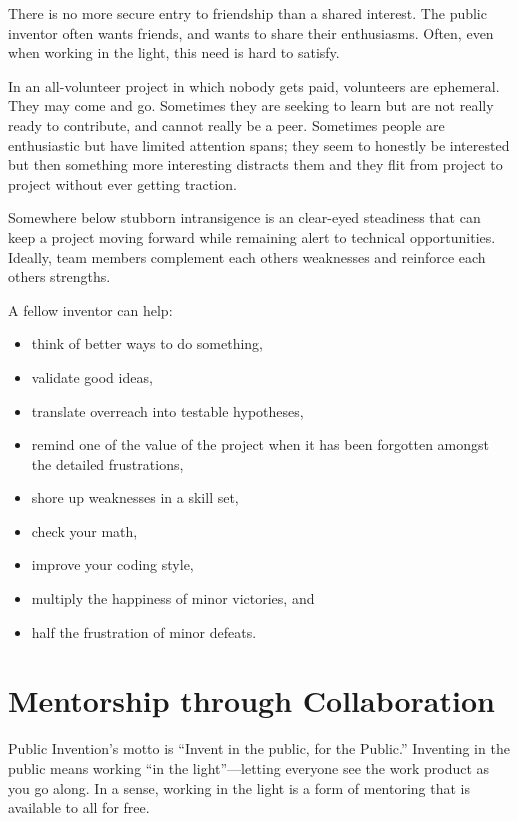 \documentclass[
	fontsize=10pt, %
	twoside=false, %
	secnumdepth=1, %
]{kaobook}
\begin{document}
There is no more secure entry to friendship than a shared interest.
The public inventor often wants friends, and wants to share
their enthusiasms.
Often, even when working in the light, this need
is hard to satisfy.

In an all-volunteer project in which nobody gets paid,
volunteers are ephemeral. They may come and go.
Sometimes they are seeking to learn but are not
really ready to contribute, and cannot really
be a peer.
Sometimes people are enthusiastic but have limited
attention spans; they seem to honestly be interested
but then something more interesting distracts them and
they flit from project to project without ever getting traction.

Somewhere below stubborn intransigence is an
clear-eyed steadiness that can keep a project
moving forward while remaining alert to technical opportunities.
Ideally, team members complement each others weaknesses
and reinforce each others strengths.

A fellow inventor can help:
\begin{itemize}
\item think of better ways to do something,
\item validate good ideas,
\item translate overreach into testable hypotheses,
\item remind one of the value of the project when it has been forgotten amongst the detailed frustrations,
\item shore up weaknesses in a skill set,
\item check your math,
\item improve your coding style,
\item multiply the happiness of minor victories, and
  \item half the frustration of minor defeats.
  \end{itemize}

\section{Mentorship through Collaboration}

Public Invention’s motto is “Invent in the public, for the
Public.”  Inventing in the
public means working “in the light”---letting everyone see the work
product as you go along.  In a sense, working in the light is a form
of mentoring that is available to all for free.
\end{document}
